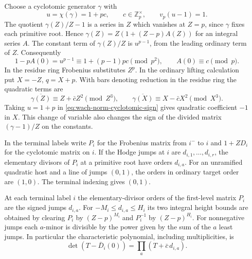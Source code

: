Choose a cyclotomic generator \(\gamma\) with
\[
 u=\chi(\gamma)=1+pc,\qquad c\in\mathbb Z_p^\times,\qquad v_p(u-1)=1.
\]
The quotient
\(\gamma(Z)/Z-1\) is a series in \(Z\) which vanishes at
\(Z=p\), since \(\gamma\) fixes each primitive root. Hence
\(\gamma(Z)=Z(1+(Z-p)A(Z))\) for an integral series \(A\).
The constant term of \(\gamma(Z)/Z\) is \(u^{p-1}\), from
the leading ordinary term of \(Z\). Consequently
\[
 1-pA(0)=u^{p-1}\equiv 1+(p-1)pc\pmod{p^2},
 \qquad A(0)\equiv c\pmod p .
\]
In the residue ring Frobenius substitutes \(Z^p\). In the
ordinary lifting calculation put \(X=-Z\), \(q=X+p\). With bars
denoting reduction in the residue ring the quadratic terms are
\begin{equation}\label{eq:wach-norm-cyclotomic-sign}
 \overline{\gamma(Z)}\equiv Z+\bar c Z^2\pmod{Z^3},\qquad
 \overline{\gamma(X)}\equiv X-\bar c X^2\pmod{X^3}.
\end{equation}
Taking \(u=1+p\) in \eqref{eq:wach-norm-cyclotomic-sign} gives
quadratic coefficient \(-1\) in \(X\). This change of variable also changes the sign
of the divided matrix \((\gamma-1)/Z\) on the constants.

In the terminal labels write \(P_i\) for the Frobenius matrix
from \(i^-\) to \(i\) and \(1+Z D_i\) for the cyclotomic matrix
on \(i\). If the Hodge jumps at \(i\) are \(d_{i,1},\ldots,d_{i,r}\),
the elementary divisors of \(P_i\) at a primitive root have
orders \(d_{i,a}\). For an unramified quadratic host and a
line of jumps \((0,1)\), the orders in ordinary target order
are \((1,0)\). The terminal indexing gives \((0,1)\).
\begin{lemma}
\label{lem:first-level-terminal-heights}
At each terminal label \(i\) the elementary-divisor orders of the
first-level matrix \(P_i\) are the signed jumps \(d_{i,a}\). For
\(-M_i\le d_{i,a}\le H_i\) its two integral height bounds are
obtained by clearing \(P_i\) by \((Z-p)^{M_i}\) and \(P_i^{-1}\)
by \((Z-p)^{H_i}\). For nonnegative jumps each \(a\)-minor is
divisible by the power given by the sum of the \(a\) least
jumps. In particular the characteristic polynomial, including multiplicities, is
\[
 \det(T-\bar D_i(0))=\prod_a(T+\bar c\,d_{i,a}).
\]
\end{lemma}


